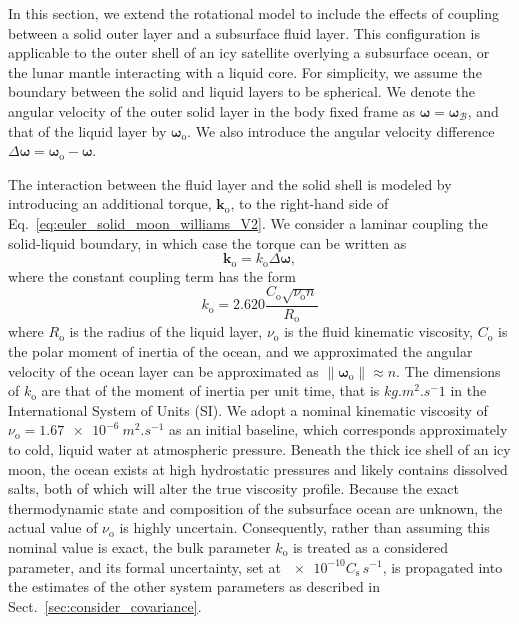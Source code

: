 \documentclass[lineno, pdflatex,sn-mathphys-ay]{sn-jnl}
\theoremstyle{thmstyleone}%
\theoremstyle{thmstyletwo}%
\theoremstyle{thmstylethree}%
\let\unit\si
\renewcommand{\vec}[1]{\boldsymbol{#1}}
\begin{document}
In this section, we extend the rotational model to include the effects of coupling between a solid outer layer and a subsurface fluid layer. This configuration is applicable to the outer shell of an icy satellite overlying a subsurface ocean, or the lunar mantle interacting with a liquid core.
For simplicity, we assume the boundary between the solid and liquid layers to be spherical.
%
We denote the angular velocity of the outer solid layer in the body fixed frame as ${\vec{\omega} = \vec{\omega}_\mathcal{B}}$, and that of the liquid layer by $\vec{\omega}_{\mathrm{o}}$. We also introduce the angular velocity difference ${\Delta \vec{\omega} = \vec{\omega}_{\mathrm{o}} -  \vec{\omega}}$.


The interaction between the fluid layer and the solid shell is modeled by introducing an additional torque, $\vec{k}_{\mathrm{o}}$, to the right-hand side of Eq.~\eqref{eq:euler_solid_moon_williams_V2}. 
%
We consider a laminar coupling the solid-liquid boundary, in which case the torque can be written as \citep{1981RSPTA.303..327Y} %
%
\begin{equation}
	\vec{k}_{\mathrm{o}} =
	k_\mathrm{o}  \Delta \vec{\omega},
\end{equation}
%
where the constant coupling term has the form \citep{1981RSPTA.303..327Y, 1995Icar..117..250Y, 1968JFM....33..739B, 1965PCPS...61..279R}
\begin{equation}
	\label{eq:ocean_damping_coeff_laminar_V2}
	k_\mathrm{o} = 2.620  \frac{C_\mathrm{o} \sqrt{\nu_\mathrm{o} n}}{R_\mathrm{o}}
\end{equation}
where $R_\mathrm{o}$ is the radius of the liquid layer, $\nu_\mathrm{o}$ is the fluid kinematic viscosity, $C_\mathrm{o}$ is the polar moment of inertia of the ocean, and we approximated the angular velocity of the ocean layer can be approximated as $\|\vec{\omega}_\mathrm{o}\| \approx n$.
The dimensions of $k_\mathrm{o}$ are that of the moment of inertia per unit time, that is $\unit{kg.m^2.s^-1}$ in the International System of Units (SI).
%
We adopt a nominal kinematic viscosity of $\nu_\mathrm{o} = \SI{1.67e-6}{m^2.s^{-1}}$ as an initial baseline, which corresponds approximately to cold, liquid water at atmospheric pressure. Beneath the thick ice shell of an icy moon, the ocean exists at high hydrostatic pressures and likely contains dissolved salts, both of which will alter the true viscosity profile. Because the exact thermodynamic state and composition of the subsurface ocean are unknown, the actual value of $\nu_\mathrm{o}$ is highly uncertain. Consequently, rather than assuming this nominal value is exact, the bulk parameter $k_\mathrm{o}$ is treated as a considered parameter, and its formal uncertainty, set at $\num{e-10}C_\mathrm{s}\,\unit{s^{-1}}$, is propagated into the estimates of the other system parameters as described in Sect.~\ref{sec:consider_covariance}.
\end{document}
